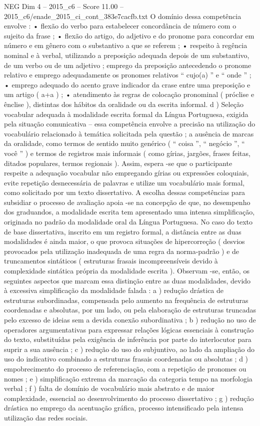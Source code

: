 \begin{textsample}{NEG Dim 4 – 2015\_c6 – Score 11.00 – 2015\_c6/enade\_2015\_ci\_cont\_383e7cacfb.txt}
O domínio dessa competência envolve : • flexão do verbo para estabelecer concordância de número com o sujeito da frase ; • flexão do artigo, do adjetivo e do pronome para concordar em número e em gênero com o substantivo a que se referem ; • respeito à regência nominal e à verbal, utilizando a preposição adequada depois de um substantivo, de um verbo ou de um adjetivo ; emprego da preposição antecedendo o pronome relativo e emprego adequadamente os pronomes relativos “ cujo(a) ” e “ onde ” ; • emprego adequado do acento grave indicador da crase entre uma preposição e um artigo ( a+a ) ; • atendimento às regras de colocação pronominal ( próclise e ênclise ), distintas dos hábitos da oralidade ou da escrita informal. d ) Seleção vocabular adequada à modalidade escrita formal da Língua Portuguesa, exigida pela situação comunicativa – essa competência envolve a precisão na utilização do vocabulário relacionado à temática solicitada pela questão ; a ausência de marcas da oralidade, como termos de sentido muito genérico ( “ coisa ”, “ negócio ”, “ você ” ) e termos de registros mais informais ( como gírias, jargões, frases feitas, ditados populares, termos regionais ).
Assim, espera -se que o participante respeite a adequação vocabular não empregando gírias ou expressões coloquiais, evite repetição desnecessária de palavras e utilize um vocabulário mais formal, como solicitado por um texto dissertativo.
A escolha dessas competências para subsidiar o processo de avaliação apoia -se na concepção de que, no desempenho dos graduandos, a modalidade escrita tem apresentado uma intensa simplificação, originada no padrão da modalidade oral da Língua Portuguesa.
No caso do texto de base dissertativa, inscrito em um registro formal, a distância entre as duas modalidades é ainda maior, o que provoca situações de hipercorreção ( desvios provocados pela utilização inadequada de uma regra da norma-padrão ) e de truncamentos sintáticos ( estruturas frasais incompreensíveis devido à complexidade sintática própria da modalidade escrita ).
Observam -se, então, os seguintes aspectos que marcam essa distinção entre as duas modalidades, devido à excessiva simplificação da modalidade falada : a ) redução drástica de estruturas subordinadas, compensada pelo aumento na frequência de estruturas coordenadas e absolutas, por um lado, ou pela elaboração de estruturas truncadas pelo excesso de ideias sem a devida conexão subordinativa ; b ) redução no uso de operadores argumentativas para expressar relações lógicas essenciais à construção do texto, substituídas pela exigência de inferência por parte do interlocutor para suprir a sua ausência ; c ) redução do uso do subjuntivo, ao lado da ampliação do uso do indicativo combinado a estruturas frasais coordenadas ou absolutas ; d ) empobrecimento do processo de referenciação, com a repetição de pronomes ou nomes ; e ) simplificação extrema da marcação da categoria tempo na morfologia verbal ; f ) falta de domínio de vocabulário mais abstrato e de maior complexidade, essencial ao desenvolvimento do processo dissertativo ; g ) redução drástica no emprego da acentuação gráfica, processo intensificado pela intensa utilização das redes sociais.

\end{textsample}
